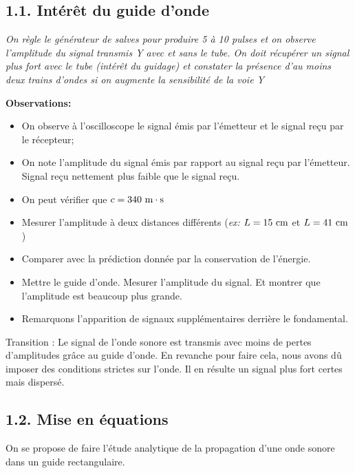 \documentclass[french, a4paper, 10pt, twocolumn, landscape]{article}
\begin{document}
\subsection*{1.1. Intérêt du guide d'onde}

\textit{On règle le générateur de salves pour produire 5 à 10 pulses et on observe l'amplitude du signal
transmis Y avec et sans le tube. On doit récupérer un signal plus fort avec le tube (intérêt du guidage)
et constater la présence d’au moins deux trains d’ondes si on augmente la sensibilité de la voie Y}


\textbf{Observations:}
\begin{itemize}
	\item On observe à l'oscilloscope le signal émis par l'émetteur et le signal reçu par le récepteur;
	\item On note l'amplitude du signal émis par rapport au signal reçu par l'émetteur. Signal reçu nettement plus faible que le signal reçu.
	\item On peut vérifier que $c=340~\rm m\cdot s$
	\item Mesurer l'amplitude à deux distances différents (\textit{ex:} $L = 15~\rm cm$ et $L=41~\rm cm$)
	\item Comparer avec la prédiction donnée par la conservation de l'énergie.
	\item Mettre le guide d'onde. Mesurer l'amplitude du signal. Et montrer que l'amplitude est beaucoup plus grande. 
	\item Remarquons l'apparition de signaux supplémentaires derrière le fondamental.
\end{itemize} 

Transition : Le signal de l'onde sonore est transmis avec moins de pertes d'amplitudes grâce au guide d'onde. En revanche pour faire cela, nous avons dû imposer des conditions strictes sur l'onde. Il en résulte un signal plus fort certes mais dispersé.

\subsection*{1.2. Mise en équations}

On se propose de faire l'étude analytique de la propagation d'une onde sonore dans un guide rectangulaire.
\end{document}
